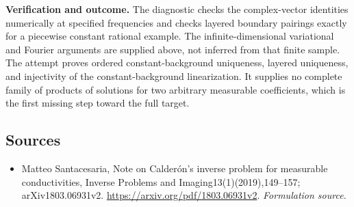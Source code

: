 \documentclass[11pt]{article}
\begin{document}
\textbf{Verification and outcome.}
The diagnostic checks the complex-vector identities numerically at specified
frequencies and checks layered boundary pairings exactly for a piecewise
constant rational example.  The infinite-dimensional variational and Fourier
arguments are supplied above, not inferred from that finite sample.  The
attempt proves ordered constant-background uniqueness, layered uniqueness,
and injectivity of the constant-background linearization.  It supplies no
complete family of products of solutions for two arbitrary measurable
coefficients, which is the first missing step toward the full target.
\subsection{Sources}
\begin{itemize}
\item[S1]Matteo Santacesaria, Note on Calderón's inverse problem for measurable conductivities, Inverse Problems and Imaging13(1)(2019),149–157; arXiv1803.06931v2.
\url{https://arxiv.org/pdf/1803.06931v2}.
\textit{Formulation source.}
\end{itemize}
\end{document}
